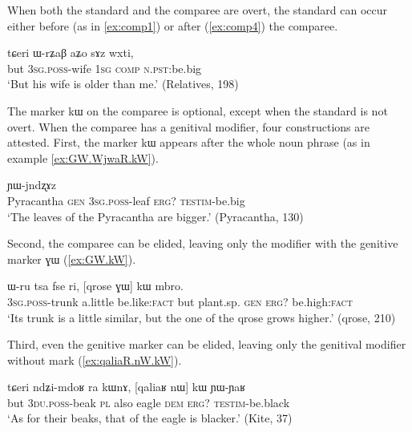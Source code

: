 \documentclass[oldfontcommands,oneside,a4paper,11pt]{article}
\newcommand{\ipa}[1]{{\phon #1}} %
\begin{document}
 When both the standard and the comparee are overt, the standard can occur either before (as in  \ref{ex:comp1}) or after (\ref{ex:comp4}) the comparee.  
 
\begin{exe}
\ex \label{ex:comp4}
\gll 
\ipa{tɕeri}  	\ipa{ɯ-rʑaβ}  	\ipa{aʑo}  	\ipa{sɤz}  	\ipa{wxti,}  \\
but \textsc{3sg.poss}-wife \textsc{1sg} \textsc{comp} \textsc{n.pst:}be.big \\
\glt `But his wife is older than me.' (Relatives, 198)
\end{exe}


The marker \ipa{kɯ} on the comparee is optional, except when the standard is not overt. When the comparee has a genitival modifier, four constructions are attested. First,  the marker \ipa{kɯ} appears after the whole noun phrase (as in example \ref{ex:GW.WjwaR.kW}). 

\begin{exe}
\ex \label{ex:GW.WjwaR.kW}
\gll 
[\ipa{tɤru}  	\ipa{ɣɯ}  	\ipa{ɯ-jwaʁ}]  	\ipa{kɯ}  	\ipa{ɲɯ-jndʐɤz}  \\
Pyracantha \textsc{gen} \textsc{3sg.poss}-leaf \textsc{erg?} \textsc{testim}-be.big \\
\glt `The leaves of the Pyracantha are bigger.' (Pyracantha, 130)
 \end{exe}
 
Second,  the comparee can be elided, leaving only the modifier with the genitive marker \ipa{ɣɯ} (\ref{ex:GW.kW}).  

\begin{exe}
\ex \label{ex:GW.kW}
\gll 
\ipa{ɯ-ru}  	\ipa{tsa}  	\ipa{fse}  	\ipa{ri,}  	[\ipa{qrose}  	\ipa{ɣɯ}]  	\ipa{kɯ}  	\ipa{mbro.}  \\
\textsc{3sg.poss}-trunk a.little be.like:\textsc{fact} but plant.sp. \textsc{gen} \textsc{erg?} be.high:\textsc{fact} \\
\glt `Its  trunk is a little similar, but the one of the \ipa{qrose} grows higher.' (\ipa{qrose}, 210)
\end{exe}

Third, even the genitive marker can be elided, leaving only the genitival modifier without mark (\ref{ex:qaliaR.nW.kW}).

\begin{exe}
\ex \label{ex:qaliaR.nW.kW}
\gll 
\ipa{tɕeri}  	\ipa{ndʑi-mdoʁ}  	\ipa{ra}  	\ipa{kɯnɤ,}  	[\ipa{qaliaʁ}  	\ipa{nɯ}]  	\ipa{kɯ}  	\ipa{ɲɯ-ɲaʁ}  \\
but \textsc{3du.poss}-beak \textsc{pl} also eagle \textsc{dem} \textsc{erg?} \textsc{testim}-be.black \\
\glt `As for their beaks, that of the eagle is blacker.' (Kite, 37)
\end{exe}
\end{document}
